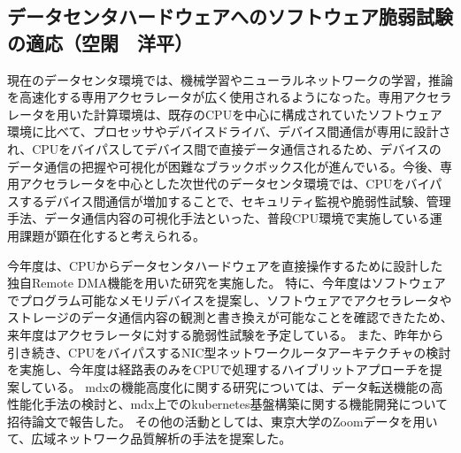 \subsection{データセンタハードウェアへのソフトウェア脆弱試験の適応（空閑　洋平）}

現在のデータセンタ環境では、機械学習やニューラルネットワークの学習，推論を高速化する専用アクセラレータが広く使用されるようになった。専用アクセラレータを用いた計算環境は、既存のCPUを中心に構成されていたソフトウェア環境に比べて、プロセッサやデバイスドライバ、デバイス間通信が専用に設計され、CPUをバイパスしてデバイス間で直接データ通信されるため、デバイスのデータ通信の把握や可視化が困難なブラックボックス化が進んでいる。今後、専用アクセラレータを中心とした次世代のデータセンタ環境では、CPUをバイパスするデバイス間通信が増加することで、セキュリティ監視や脆弱性試験、管理手法、データ通信内容の可視化手法といった、普段CPU環境で実施している運用課題が顕在化すると考えられる。

今年度は、CPUからデータセンタハードウェアを直接操作するために設計した独自Remote DMA機能を用いた研究を実施した\cite{ykuga39987672,ykuga41835070,ykuga37056192}。
特に、今年度はソフトウェアでプログラム可能なメモリデバイスを提案し、ソフトウェアでアクセラレータやストレージのデータ通信内容の観測と書き換えが可能なことを確認できたため、来年度はアクセラレータに対する脆弱性試験を予定している。
また、昨年から引き続き、CPUをバイパスするNIC型ネットワークルータアーキテクチャの検討を実施し、今年度は経路表のみをCPUで処理するハイブリットアプローチを提案している\cite{ykuga36919054}。
mdxの機能高度化に関する研究については、データ転送機能の高性能化手法の検討と、mdx上でのkubernetes基盤構築に関する機能開発について招待論文で報告した\cite{ykuga41835081,ykuga41534619}。
その他の活動としては、東京大学のZoomデータを用いて、広域ネットワーク品質解析の手法を提案した\cite{ykuga40356877}。
